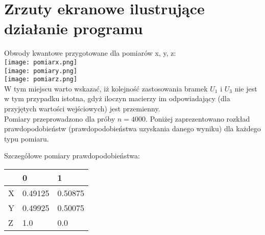 \documentclass{article}
\begin{document}
\section{Zrzuty ekranowe ilustrujące działanie programu}
Obwody kwantowe przygotowane dla pomiarów x, y, z:\\
\texttt{[image: pomiarx.png]}\\
\texttt{[image: pomiary.png]}\\
\texttt{[image: pomiarz.png]}\\
W tym miejscu warto wskazać, iż kolejność zastosowania bramek $U_1$ i $U_3$ nie jest w tym przypadku istotna, gdyż iloczyn macierzy im odpowiadający (dla przyjętych wartości wejściowych) jest przemienny.\\
Pomiary przeprowadzono dla próby $n=4000$. Poniżej zaprezentowano rozkład prawdopodobieństw (prawdopodobieństwa uzyskania danego wyniku) dla każdego typu pomiaru.
\begin{center}
\end{center}

Szczegółowe pomiary prawdopodobieństwa:\\
\begin{center}
\begin{tabular}{l|l|l|}
\cline{2-3}
                        & 0       & 1       \\ \hline
\multicolumn{1}{|l|}{X} & 0.49125 & 0.50875 \\ \hline
\multicolumn{1}{|l|}{Y} & 0.49925 & 0.50075 \\ \hline
\multicolumn{1}{|l|}{Z} & 1.0     & 0.0     \\ \hline
\end{tabular}
\end{center}
\end{document}
